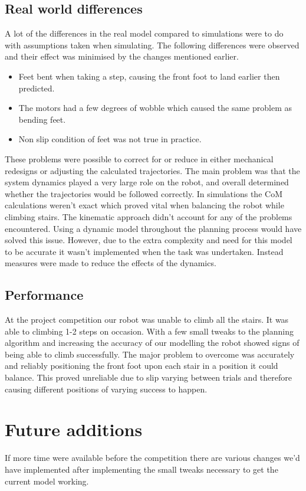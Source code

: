 \documentclass[twoside,twocolumn]{article}
\begin{document}
\subsection{Real world differences}
A lot of the differences in the real model compared to simulations were to do with assumptions taken when simulating. The following differences were observed and their effect was minimised by the changes mentioned earlier.
\begin{itemize}
\item Feet bent when taking a step, causing the front foot to land earlier then predicted.
\item The motors had a few degrees of wobble which caused the same problem as bending feet.
\item Non slip condition of feet was not true in practice.
\end{itemize}
These problems were possible to correct for or reduce in either mechanical redesigns or adjusting the calculated trajectories. The main problem was that the system dynamics played a very large role on the robot, and overall determined whether the trajectories would be followed correctly. 
\newline
In simulations the CoM calculations weren't exact which proved vital when balancing the robot while climbing stairs. The kinematic approach didn't account for any of the problems encountered. Using a dynamic model throughout the planning process would have solved this issue. However, due to the extra complexity and need for this model to be accurate it wasn't implemented when the task was undertaken. Instead measures were made to reduce the effects of the dynamics.
\subsection{Performance}
At the project competition our robot was unable to climb all the stairs. It was able to climbing 1-2 steps on occasion. With a few small tweaks to the planning algorithm and increasing the accuracy of our modelling the robot showed signs of being able to climb successfully. The major problem to overcome was accurately and reliably positioning the front foot upon each stair in a position it could balance. This proved unreliable due to slip varying between trials and therefore causing different positions of varying success to happen.
\section{Future additions}
If more time were available before the competition there are various changes we'd have implemented after implementing the small tweaks necessary to get the current model working.
\end{document}
